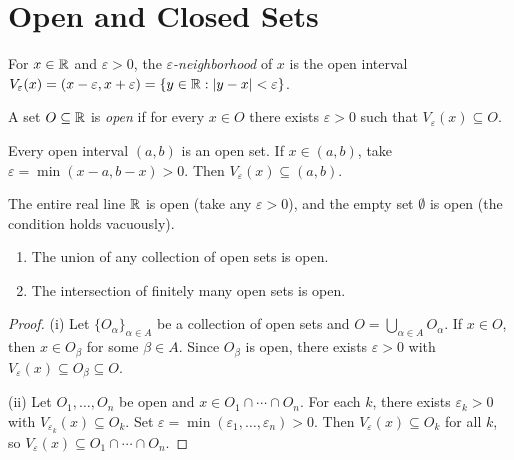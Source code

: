 \documentclass[11pt,a4paper]{article}
\begin{document}
\section{Open and Closed Sets}
\label{sec:open_closed}

\begin{definition}
\label{def:neighborhood}
For $x \in \mathbb{R}$ and $\varepsilon > 0$, the \emph{$\varepsilon$-neighborhood}
of $x$ is the open interval
$V_\varepsilon(x) = (x - \varepsilon, x + \varepsilon) = \{y \in \mathbb{R} :
|y - x| < \varepsilon\}$.
\end{definition}

\begin{definition}
\label{def:open}
A set $O \subseteq \mathbb{R}$ is \emph{open} if for every $x \in O$ there exists
$\varepsilon > 0$ such that $V_\varepsilon(x) \subseteq O$.
\end{definition}

\begin{example}
\label{ex:open_interval}
Every open interval $(a, b)$ is an open set. If $x \in (a, b)$, take
$\varepsilon = \min(x - a, b - x) > 0$. Then
$V_\varepsilon(x) \subseteq (a, b)$.
\end{example}

\begin{example}
\label{ex:R_open}
The entire real line $\mathbb{R}$ is open (take any $\varepsilon > 0$), and the
empty set $\emptyset$ is open (the condition holds vacuously).
\end{example}

\begin{theorem}
\label{thm:open_props}
\begin{enumerate}[nosep,label=(\roman*)]
  \item The union of any collection of open sets is open.
  \item The intersection of finitely many open sets is open.
\end{enumerate}
\end{theorem}

\begin{proof}
(i) Let $\{O_\alpha\}_{\alpha \in A}$ be a collection of open sets and
$O = \bigcup_{\alpha \in A} O_\alpha$. If $x \in O$, then $x \in O_\beta$
for some $\beta \in A$. Since $O_\beta$ is open, there exists
$\varepsilon > 0$ with $V_\varepsilon(x) \subseteq O_\beta \subseteq O$.

(ii) Let $O_1, \ldots, O_n$ be open and $x \in O_1 \cap \cdots \cap O_n$.
For each $k$, there exists $\varepsilon_k > 0$ with
$V_{\varepsilon_k}(x) \subseteq O_k$. Set
$\varepsilon = \min(\varepsilon_1, \ldots, \varepsilon_n) > 0$. Then
$V_\varepsilon(x) \subseteq O_k$ for all $k$, so
$V_\varepsilon(x) \subseteq O_1 \cap \cdots \cap O_n$.
\end{proof}
\end{document}
